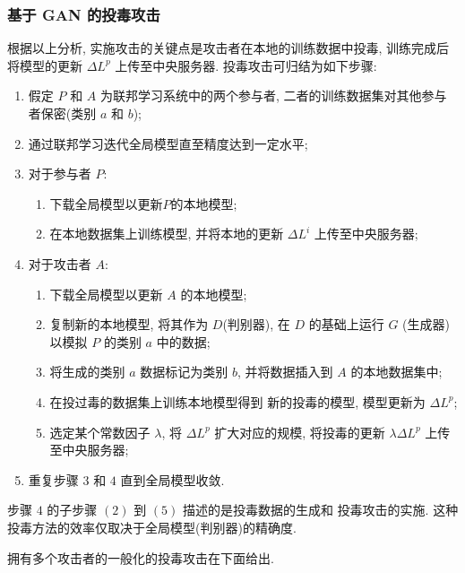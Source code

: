 \documentclass[../main.tex]{subfiles}
\begin{document}
\subsubsection{基于 GAN 的投毒攻击}
根据以上分析, 实施攻击的关键点是攻击者在本地的训练数据中投毒,
训练完成后将模型的更新 $ \Delta L^p $ 上传至中央服务器.
投毒攻击可归结为如下步骤:
\begin{enumerate}
  \item 假定 $ P $ 和 $ A $ 为联邦学习系统中的两个参与者,
    二者的训练数据集对其他参与者保密(类别 $ a $ 和 $ b $);
  \item 通过联邦学习迭代全局模型直至精度达到一定水平;
  \item 对于参与者 $ P $:
    \begin{enumerate}
      \item 下载全局模型以更新$ P $的本地模型;
      \item 在本地数据集上训练模型, 并将本地的更新 $ \Delta L^i $
        上传至中央服务器;
    \end{enumerate}
  \item 对于攻击者 $ A $:
    \begin{enumerate}
      \item 下载全局模型以更新 $ A $ 的本地模型;
      \item 复制新的本地模型, 将其作为 $ D $(判别器),
        在 $ D $ 的基础上运行 $ G $ (生成器) 以模拟
        $ P $ 的类别 $ a $ 中的数据;
      \item 将生成的类别 $ a $ 数据标记为类别 $ b $,
        并将数据插入到 $ A $ 的本地数据集中;
      \item 在投过毒的数据集上训练本地模型得到
        新的投毒的模型, 模型更新为 $ \Delta L^p $;
      \item 选定某个常数因子 $ \lambda $, 将 $ \Delta L^p $
        扩大对应的规模, 将投毒的更新 $ \lambda\Delta L^p $
        上传至中央服务器;
    \end{enumerate}
  \item 重复步骤 $ 3 $ 和 $ 4 $ 直到全局模型收敛.
\end{enumerate}
步骤 $ 4 $ 的子步骤 $ (2) $ 到 $ (5) $ 描述的是投毒数据的生成和
投毒攻击的实施. 这种投毒方法的效率仅取决于全局模型(判别器)的精确度.

拥有多个攻击者的一般化的投毒攻击在下面给出.
\end{document}

